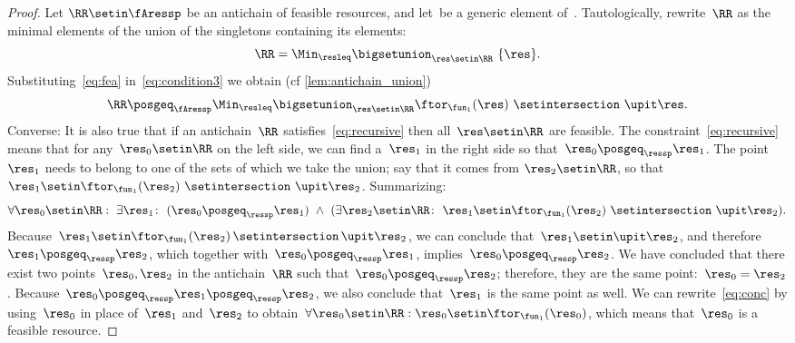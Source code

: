 \begin{proof}
    Let $\RR\setin\fAressp$ be an antichain of feasible resources, and let~\res be a generic element of~\ressp.
    Tautologically, rewrite~$\RR$ as the minimal elements of the union of the singletons containing its elements:
    \begin{equation}
        \RR=\Min_{\resleq}\bigsetunion_{\res\setin\RR}\ \{\res\}.
        \label{eq:condition3}
    \end{equation}
    Substituting~\cref{eq:fea} in~\cref{eq:condition3} we obtain (cf
    \cref{lem:antichain_union})
    \begin{equation}
        \RR\posgeq_{\fAressp}\Min_{\resleq}\bigsetunion_{\res\setin\RR}\ftor_{\fun_{1}}(\res)\ \setintersection\ \upit\res.
        \label{eq:recursive}
    \end{equation}
    Converse: It is also true that if an antichain~$\RR$ satisfies~\cref{eq:recursive} then all~$\res\setin\RR$ are feasible.
    The constraint~\cref{eq:recursive} means that for any~$\res_{0}\setin\RR$ on the left side, we can find a~$\res_{1}$ in the right side so that~$\res_{0}\posgeq_{\ressp}\res_{1}$.
    The point~$\res_{1}$ needs to belong to one of the sets of which we take the union; say that it comes from $\res_{2}\setin\RR$, so that $\res_{1}\setin\ftor_{\fun_{1}}(\res_{2})\ \setintersection\ \upit\res_{2}$.
    Summarizing:
    \begin{equation}
        \forall\res_{0}\setin\RR:\ \exists\res_{1}\colon\ (\res_{0}\posgeq_{\ressp}\res_{1})\ \wedge\ (\exists\res_{2}\setin\RR\colon\ \res_{1}\setin\ftor_{\fun_{1}}(\res_{2})\ \setintersection\ \upit\res_{2}).
        \label{eq:conc}
    \end{equation}
    Because~$\res_{1}\setin\ftor_{\fun_{1}}(\res_{2})\,\setintersection\,\upit\res_{2}$, we can conclude that~$\res_{1}\setin\upit\res_{2}$, and therefore~$\res_{1}\posgeq_{\ressp}\res_{2}$, which together with~$\res_{0}\posgeq_{\ressp}\res_{1}$, implies~$\res_{0}\posgeq_{\ressp}\res_{2}$.
    We have concluded that there exist two points~$\res_{0},\res_{2}$ in the antichain~$\RR$ such that~$\res_{0}\posgeq_{\ressp}\res_{2}$; therefore, they are the same point:~$\res_{0}=\res_{2}$.
    Because~$\res_{0}\posgeq_{\ressp}\res_{1}\posgeq_{\ressp}\res_{2}$, we also conclude that~$\res_{1}$ is the same point as well.
    We can rewrite~\cref{eq:conc} by using~$\res_{0}$ in place of~$\res_{1}$ and~$\res_{2}$ to obtain~$\forall\res_{0}\setin\RR:\res_{0}\setin\ftor_{\fun_{1}}(\res_{0})$,
    which means that~$\res_{0}$ is a feasible resource.


\end{proof}
